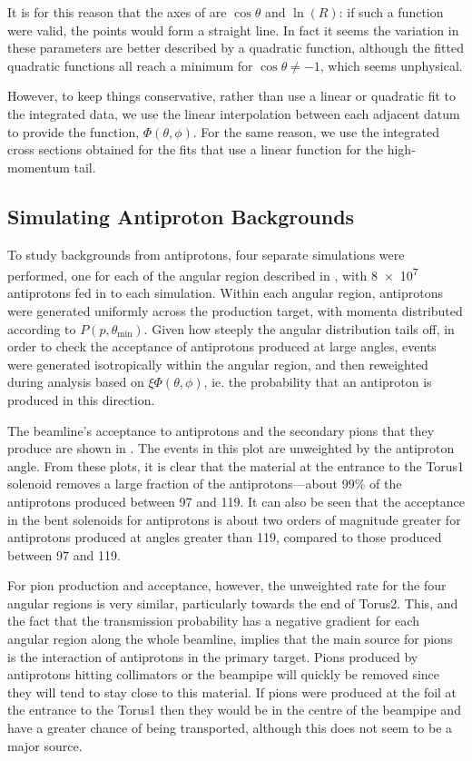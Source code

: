 It is for this reason that the axes of  are $\cos\theta$ and $\ln(R)$: if such a function were valid, the points would form a straight line.
In fact it seems the variation in these parameters are better described by a quadratic function, although the fitted quadratic functions all reach a minimum for $\cos\theta\ne-1$, which seems unphysical.

However, to keep things conservative, rather than use  a linear or quadratic fit to the integrated data, we use the linear interpolation between each adjacent datum to provide the function, $\Phi(\theta,\phi)$.
For the same reason, we use the integrated cross sections obtained for the fits that use a linear function for the high-momentum tail.

\TabAntiprotonRegions
\subsection{Simulating Antiproton Backgrounds}
\FigAntiprotonSimFluxes
To study backgrounds from antiprotons, four separate simulations were performed, one for each of the angular region described in , with \num{8e7} antiprotons fed in to each simulation.
Within each angular region, antiprotons were generated uniformly across the production target, with momenta distributed according to $P(p,\theta_\textrm{min})$.
Given how steeply the angular distribution tails off, in order to check the acceptance of antiprotons produced at large angles, events were generated isotropically within the angular region, and then reweighted during analysis based on $\xi\Phi(\theta,\phi)$, ie. the probability that an antiproton is produced in this direction.

The beamline's acceptance to antiprotons and the secondary pions that they produce are shown in .
The events in this plot are unweighted by the antiproton angle.
From these plots, it is clear that the material at the entrance to the Torus1 solenoid removes a large fraction of the antiprotons---about 99\% of the antiprotons produced between 97 and 119\degree.
It can also be seen that the acceptance in the bent solenoids for antiprotons is about two orders of magnitude greater for antiprotons produced at angles greater than 119\degree, compared to those produced between 97 and 119\degree.

For pion production and acceptance, however, the unweighted rate for the four angular regions is very similar, particularly towards the end of Torus2.
This, and the fact that the transmission probability has a negative gradient for each angular region along the whole beamline, implies that the main source for pions is the interaction of antiprotons in the primary target.
Pions produced by antiprotons hitting collimators or the beampipe will quickly be removed since they will tend to stay close to this material.
If pions were produced at the foil at the entrance to the Torus1 then they would be in the centre of the beampipe and have a greater chance of being transported, although this does not seem to be a major source.

